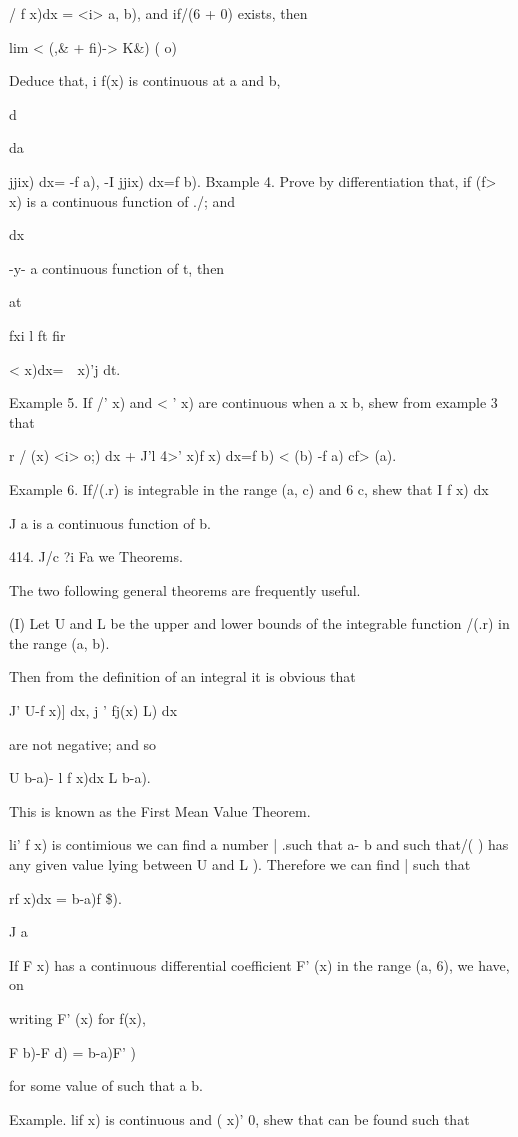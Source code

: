/ f x)dx = <i> a, b), and if/(6 + 0) exists, then

lim < (,\& + fi)-> K\&) ( o)

Deduce that, i f(x) is continuous at a and b,

d\

da

jjix) dx= -f a), -I jjix) dx=f b). Bxample 4. Prove by differentiation
that, if (f> x) is a continuous function of ./; and

dx

-y- a continuous function of t, then

at

fxi l ft fir

 < x)dx=\ \ x)'j dt.

Example 5. If /' x) and < ' x) are continuous when a x b, shew from
example 3 that

r / (x) <i> o;) dx + J'l 4>' x)f x) dx=f b) < (b) -f a) cf> (a).

Example 6. If/(.r) is integrable in the range (a, c) and 6 c, shew
that I f x) dx

J a is a continuous function of b.

414. J/c ?i Fa we Theorems.

The two following general theorems are frequently useful.

(I) Let U and L be the upper and lower bounds of the integrable
function /(.r) in the range (a, b).

Then from the definition of an integral it is obvious that

J' U-f x)] dx, j ' fj(x) L) dx

are not negative; and so

U b-a)- l f x)dx L b-a).

This is known as the First Mean Value Theorem.

li' f x) is contimious we can find a number | .such that a- b and such
that/( ) has any given value lying between U and L ). Therefore
we can find | such that

rf x)dx = b-a)f \$).

J a

If F x) has a continuous differential coefficient F' (x) in the range
(a, 6), we have, on

writing F' (x) for f(x),

F b)-F d) = b-a)F' )

for some value of such that a b.

Example. lif x) is continuous and ( x)' 0, shew that can be found such
that

